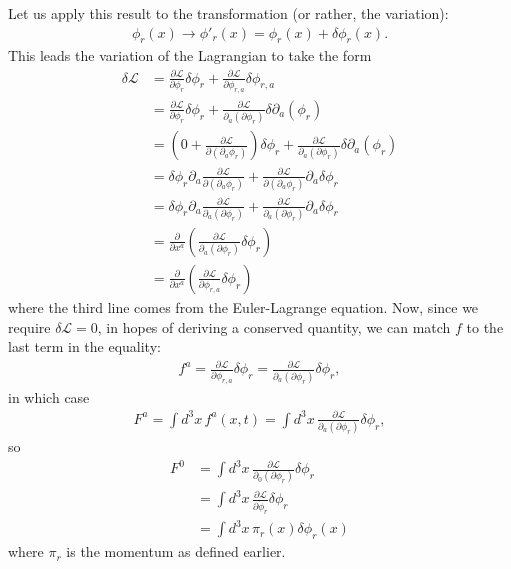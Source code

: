 \documentclass[a4paper,11pt]{article}
\numberwithin{equation}{section}
\theoremstyle{definition}
\newcommand{\p}{\partial}
\newcommand{\lag}{\mathcal{L}}
\begin{document}
Let us apply this result to the transformation (or rather, the variation):
\begin{align}
\phi_r(x) \to \phi'_r(x) = \phi_r(x) + \delta \phi_r(x).
\end{align}
This leads the variation of the Lagrangian to take the form
\begin{align}
\delta \lag &= \frac{\p \lag}{\p \phi_r}\delta \phi_r + \frac{\p\lag}{\p\phi_{r,a}}\delta \phi_{r,a}\\
&= \frac{\p \lag}{\p \phi_r}\delta \phi_r + \frac{\p\lag}{\p_a(\p\phi_r)}\delta \p_a(\phi_r)\\
&= \left(0 + \frac{\p\lag}{\p(\p_a\phi_r)}  \right)\delta \phi_r + \frac{\p\lag}{\p_a(\p\phi_r)}\delta \p_a(\phi_r)\\
&= \delta \phi_r\p_a \frac{\p\lag}{\p(\p_a\phi_r)} +  \frac{\p\lag}{\p(\p_a\phi_r)}\p_a\delta \phi_r\\
&= \delta \phi_r\p_a \frac{\p\lag}{\p_a(\p\phi_r)} +  \frac{\p\lag}{\p_a(\p\phi_r)}\p_a\delta \phi_r \\
&= \frac{\p}{\p x^a}\left( \frac{\p\lag}{\p_a(\p\phi_r)}\delta \phi_r \right)\\
&= \frac{\p}{\p x^a}\left( \frac{\p\lag}{\p\phi_{r,a}}\delta \phi_r \right)
\end{align}
where the third line comes from the Euler-Lagrange equation. Now, since we require $\delta \lag =0$, in hopes of deriving a conserved quantity, we can match $f$ to the last term in the equality:
\begin{align}
f^a = \frac{\p\lag}{\p\phi_{r,a}}\delta \phi_r = \frac{\p\lag}{\p_a(\p\phi_r)}\delta \phi_r,
\end{align}
in which case
\begin{align}
F^a = \int d^3x\, f^a(x,t) = \int d^3x\, \frac{\p\lag}{\p_a(\p\phi_r)}\delta \phi_r,
\end{align}
so
\begin{align}
F^0 &= \int d^3x\, \frac{\p\lag}{\p_0(\p\phi_r)}\delta \phi_r\\
& = \int d^3x\, \frac{\p\lag}{\p\dot{\phi}_r}\delta \phi_r\\
& = \int d^3x\, \pi_r(x)\delta \phi_r(x)
\end{align}
where $\pi_r$ is the momentum as defined earlier.\\
\end{document}
